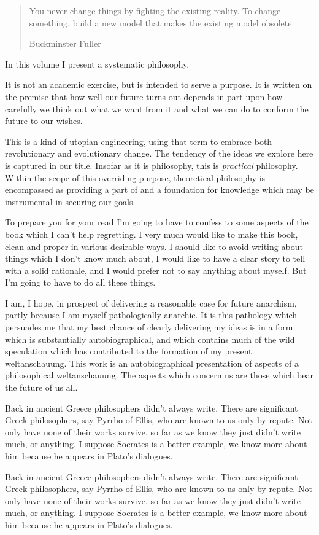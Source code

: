 \begin{quote}
You never change things by fighting the existing reality. To change something, build a new model that makes the existing model obsolete.

Buckminster Fuller

\end{quote}



In this volume I present a systematic philosophy.

It is not an academic exercise, but is intended to serve a purpose.
It is written on the premise that how well our future turns out depends in part upon how carefully we think out what we want from it and what we can do to conform the future to our wishes.

This is a kind of utopian engineering, using that term to embrace both revolutionary and evolutionary change.
The tendency of the ideas we explore here is captured in our title.
Insofar as it is philosophy, this is {\it practical} philosophy.
Within the scope of this overriding purpose, theoretical philosophy is encompassed as providing a part of and a foundation for knowledge which may be instrumental in securing our goals.

To prepare you for your read I'm going to have to confess to some aspects of the book which I can't help regretting.
I very much would like to make this book, clean and proper in various desirable ways.
I should like to avoid writing about things which I don't know much about, I would like to have a clear story to tell with a solid rationale, and I would prefer not to say anything about myself.
But I'm going to have to do all these things.

I am, I hope, in prospect of delivering a reasonable case for future anarchism, partly because I am myself pathologically anarchic.
It is this pathology which persuades me that my best chance of clearly delivering my ideas is in a form which is substantially autobiographical, and which contains much of the wild speculation which has contributed to the formation of my present weltanschauung.
This work is an autobiographical presentation of aspects of a philosophical weltanschauung.
The aspects which concern us are those which bear the future of us all.

Back in ancient Greece philosophers didn't always write.
There are significant Greek philosophers, say Pyrrho of Ellis, who are known to us only by repute.
Not only have none of their works survive, so far as we know they just didn't write much, or anything.
I suppose Socrates is a better example, we know more about him because he appears in Plato's dialogues.

Back in ancient Greece philosophers didn't always write.
There are significant Greek philosophers, say Pyrrho of Ellis, who are known to us only by repute.
Not only have none of their works survive, so far as we know they just didn't write much, or anything.
I suppose Socrates is a better example, we know more about him because he appears in Plato's dialogues.
